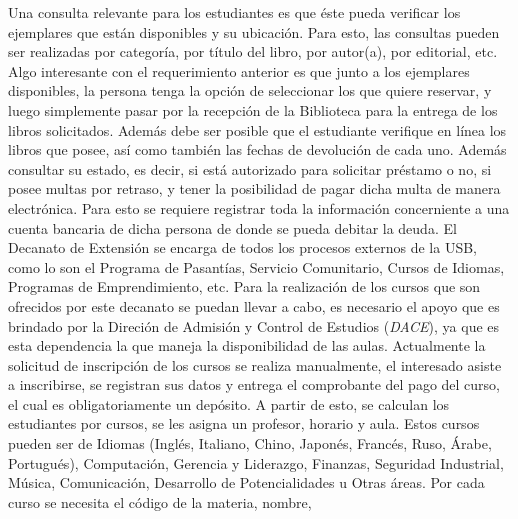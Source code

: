 \documentclass[12pt,a4paper,spanish]{article}
\begin{document}
\newline
\newline
\indent Una consulta relevante para los estudiantes es que \'este
 pueda verificar los ejemplares que est\'an disponibles y su
ubicaci\'on. Para esto, las consultas pueden ser realizadas por
categor\'ia, por t\'itulo del libro, por autor(a), por editorial, etc. Algo interesante con el requerimiento anterior es
que junto a los ejemplares disponibles, la persona tenga la opci\'on
de seleccionar los que quiere reservar, y luego simplemente pasar por
la recepci\'on de la Biblioteca para la entrega de los libros
solicitados.
\newline
\newline
\indent Adem\'as debe ser posible que el estudiante
verifique en l\'inea los libros que posee, as\'i como tambi\'en las fechas
de devoluci\'on de cada uno. Adem\'as consultar su estado, es decir, si est\'a autorizado para solicitar pr\'estamo
o no, si posee multas por retraso, y tener la posibilidad de pagar
dicha multa de manera electr\'onica. Para esto se requiere registrar toda la
informaci\'on concerniente a una cuenta bancaria de dicha persona de
donde se pueda debitar la deuda.
\newline
\newline
\indent El Decanato de Extensi\'on se encarga de todos los procesos
externos de la USB, como lo son el Programa de Pasant\'ias, Servicio
Comunitario, Cursos de Idiomas, Programas de Emprendimiento, etc. Para
la realizaci\'on de los cursos que son ofrecidos por este decanato se
puedan llevar a cabo, es necesario el apoyo que es brindado por la
Direci\'on de Admisi\'on y Control de Estudios (\emph{DACE}), ya que
es esta dependencia la que maneja la disponibilidad de las aulas. 
\newline
\newline
\indent Actualmente la solicitud de inscripci\'on de los cursos se realiza
manualmente, el interesado asiste a inscribirse, se registran sus datos
y entrega el comprobante del pago del curso, el cual es obligatoriamente un
dep\'osito. A partir de esto, se calculan los estudiantes por
cursos, se les asigna un profesor, horario y aula.
\newline
\newline
\indent Estos cursos pueden ser de Idiomas (Ingl\'es, Italiano, Chino,
Japon\'es, Franc\'es, Ruso, \'Arabe, Portugu\'es), Computaci\'on,
Gerencia y Liderazgo, Finanzas, Seguridad Industrial, M\'usica,
Comunicaci\'on, Desarrollo de Potencialidades u Otras \'areas. Por
cada curso se necesita el c\'odigo de la materia, nombre,
\end{document}
